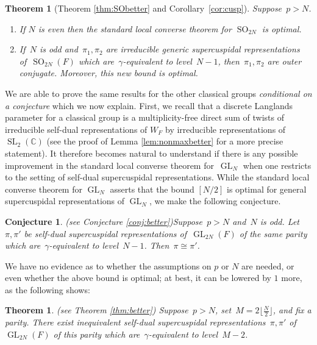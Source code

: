 \documentclass[12pt]{amsart}
\newcommand{\BC}{\mathbb {C}}
\newcommand{\GL}{\operatorname{GL}}
\newcommand{\SL}{\operatorname{SL}}
\newcommand{\SO}{\operatorname{SO}}
\newtheorem{thm}{Theorem}[section]
\newtheorem {conj}[thm]{Conjecture}
\newtheorem{thm}[equation]{Theorem}
\newtheorem{conj}[equation]{Conjecture}
\begin{document}
\begin{thm}[Theorem \ref{thm:SObetter} and Corollary~\ref{cor:cusp}]\label{thm:introSObetter}
Suppose~$p>N$.
\begin{enumerate}
\item If $N$ is even then the standard local converse theorem for $\SO_{2N}$ is optimal.
\item If~$N$ is odd and~$\pi_1,\pi_2$ are irreducible generic supercuspidal representations of~$\SO_{2N}(F)$ which are~$\gamma$-equivalent to level~$N-1$, then~$\pi_1, \pi_2$ are outer conjugate. Moreover, this new bound is optimal.
\end{enumerate}
\end{thm}

We are able to prove the same results for the other classical groups \emph{conditional on a conjecture} which we now explain. First, we recall that a discrete Langlands parameter for a classical group is a multiplicity-free direct sum of twists of irreducible self-dual representations of $W_F$ by irreducible representations of~$\SL_2(\BC)$ (see the proof of Lemma \ref{lem:nonmaxbetter} for a more precise statement).  It therefore becomes natural to understand if there is any possible improvement in the standard local converse theorem for~$\GL_N$ when one restricts to the setting of self-dual supercuspidal representations.  While the standard local converse theorem for $\GL_N$ asserts that the bound $[N/2]$ is optimal for general supercuspidal representations of $\GL_N$, we make the following conjecture.

\begin{conj}(see Conjecture \ref{conj:better})\label{conj:betterintro}
Suppose~$p>N$ and~$N$ is odd. Let~$\pi,\pi'$ be self-dual supercuspidal representations of~$\GL_{2N}(F)$ of the same parity which are~$\gamma$-equivalent to level~$N-1$.
Then~$\pi\cong\pi'$.
\end{conj}

We have no evidence as to whether the assumptions on $p$ or $N$ are needed, or even whether the above bound is optimal; at best, it can be lowered by $1$ more, as the following shows:

\begin{thm}(see Theorem \ref{thm:better})
Suppose~$p>N$, set~$M=2\lfloor\frac N2\rfloor$, and fix a parity. There exist inequivalent self-dual supercuspidal representations~$\pi,\pi'$ of~$\GL_{2N}(F)$ of this parity which are~$\gamma$-equivalent to level~$M-2$.
\end{thm}
\end{document}
